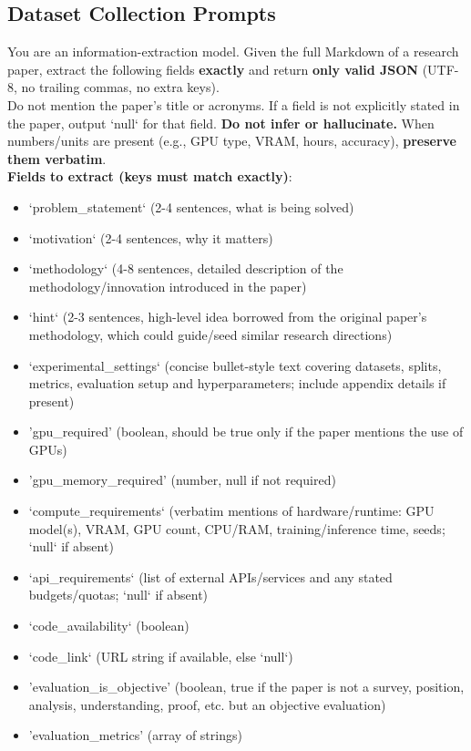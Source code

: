 \documentclass[11pt]{article}
\theoremstyle{plain}
\theoremstyle{definition}
\theoremstyle{remark}
\begin{document}
\newpage
\subsection{Dataset Collection Prompts} \label{app:data-collection-prompts}

\begin{tcolorbox}[
    colback=white,
    colframe=myPastelBlue,
    title=\textbf{\textcolor{black}{Card Extraction For Filtering}},
    boxrule=0.5mm,
    width=\linewidth,
    arc=2mm,
    boxsep=5pt,
    left=6pt, right=6pt, top=6pt, bottom=6pt,
    breakable 
]

You are an information-extraction model.
Given the full Markdown of a research paper, extract the following fields \textbf{exactly} and return \textbf{only valid JSON} (UTF-8, no trailing commas, no extra keys).\\

Do not mention the paper's title or acronyms. If a field is not explicitly stated in the paper, output `null` for that field. \textbf{Do not infer or hallucinate.}
When numbers/units are present (e.g., GPU type, VRAM, hours, accuracy), \textbf{preserve them verbatim}.\\

\textbf{Fields to extract (keys must match exactly)}:
\begin{itemize}[nolistsep, noitemsep]
    \item `problem\_statement` (2-4 sentences, what is being solved)
    \item `motivation` (2-4 sentences, why it matters)
    \item `methodology` (4-8 sentences, detailed description of the methodology/innovation introduced in the paper)
    \item `hint` (2-3 sentences, high-level idea borrowed from the original paper's methodology, which could guide/seed similar research directions)
    \item `experimental\_settings` (concise bullet-style text covering datasets, splits, metrics, evaluation setup and hyperparameters; include appendix details if present)
    \item 'gpu\_required' (boolean, should be true only if the paper mentions the use of GPUs)
    \item 'gpu\_memory\_required' (number, null if not required)
    \item `compute\_requirements` (verbatim mentions of hardware/runtime: GPU model(s), VRAM, GPU count, CPU/RAM, training/inference time, seeds; `null` if absent)
    \item `api\_requirements` (list of external APIs/services and any stated budgets/quotas; `null` if absent)
    \item `code\_availability` (boolean)
    \item `code\_link` (URL string if available, else `null`)
    \item 'evaluation\_is\_objective' (boolean, true if the paper is not a survey, position, analysis, understanding, proof, etc. but an objective evaluation)
    \item 'evaluation\_metrics' (array of strings)\\
\end{itemize}


\end{tcolorbox}
\end{document}
